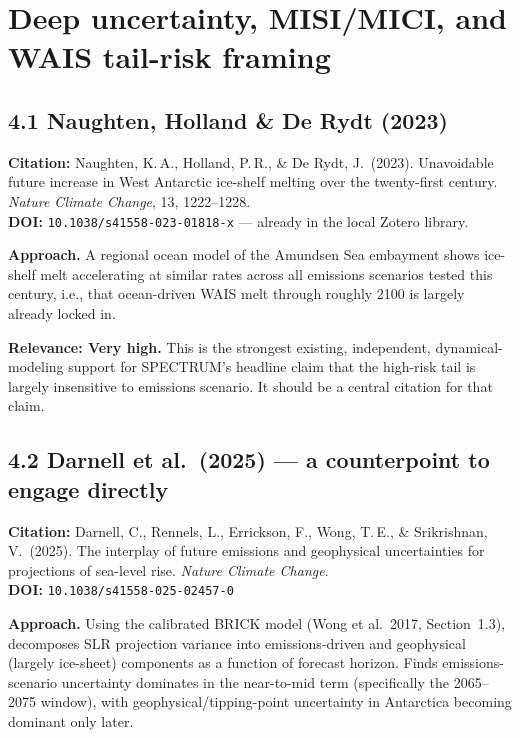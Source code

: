 \documentclass[11pt]{article}
\begin{document}
\section{Deep uncertainty, MISI/MICI, and WAIS tail-risk framing}

\subsection*{4.1 Naughten, Holland \& De Rydt (2023)}

\noindent\textbf{Citation:} Naughten, K.\,A., Holland, P.\,R., \&
De Rydt, J.\ (2023). Unavoidable future increase in West Antarctic
ice-shelf melting over the twenty-first century. \textit{Nature Climate
Change}, 13, 1222--1228.\\
\textbf{DOI:} \texttt{10.1038/s41558-023-01818-x} --- already in the local
Zotero library.

\noindent\textbf{Approach.} A regional ocean model of the Amundsen Sea
embayment shows ice-shelf melt accelerating at similar rates across all
emissions scenarios tested this century, i.e., that ocean-driven WAIS melt
through roughly 2100 is largely already locked in.

\noindent\textbf{Relevance: Very high.} This is the strongest existing,
independent, dynamical-modeling support for SPECTRUM's headline claim that
the high-risk tail is largely insensitive to emissions scenario. It should
be a central citation for that claim.

\subsection*{4.2 Darnell et al.\ (2025) --- a counterpoint to engage directly}

\noindent\textbf{Citation:} Darnell, C., Rennels, L., Errickson, F.,
Wong, T.\,E., \& Srikrishnan, V.\ (2025). The interplay of future emissions
and geophysical uncertainties for projections of sea-level rise.
\textit{Nature Climate Change}.\\
\textbf{DOI:} \texttt{10.1038/s41558-025-02457-0}

\noindent\textbf{Approach.} Using the calibrated BRICK model (Wong et al.\
2017, Section~1.3), decomposes SLR projection variance into emissions-driven
and geophysical (largely ice-sheet) components as a function of forecast
horizon. Finds emissions-scenario uncertainty dominates in the near-to-mid
term (specifically the 2065--2075 window), with geophysical/tipping-point
uncertainty in Antarctica becoming dominant only later.
\end{document}
